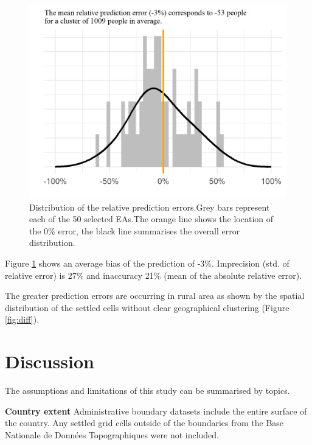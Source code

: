 \documentclass[]{book}
\begin{document}
\begin{figure}

{\centering \includegraphics[width=16.67in]{dat/BFAv1/hist-diff} 

}

\caption{Distribution of the relative prediction errors.Grey bars represent each of the 50 selected EAs.The orange line shows the location of the 0\% error, the black line summarises the overall error distribution.}\label{fig:diff2}
\end{figure}

Figure \ref{fig:diff2} shows an average bias of the prediction of -3\%.
Imprecision (std. of relative error) is 27\% and inaccuracy 21\% (mean
of the absolute relative error).

The greater prediction errors are occurring in rural area as shown by
the spatial distribution of the settled cells without clear geographical
clustering (Figure \ref{fig:diff}).

\clearpage

\section{Discussion}\label{discussion-1}

The assumptions and limitations of this study can be summarised by
topics.

\textbf{Country extent} Administrative boundary datasets include the
entire surface of the country. Any settled grid cells outside of the
boundaries from the Base Nationale de Données Topographiques
\citep{institutgeographiqueduburkinafaso2015} were not included.
\end{document}
